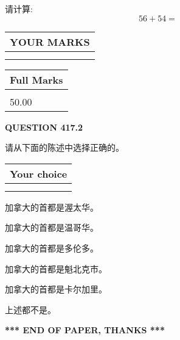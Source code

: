 \documentclass{ctexart}
\begin{document}
  
 
请计算:
\begin{equation}
56 +  %
54 = \nonumber
\end{equation}
 

 

 
  
\vspace{0.2in}
  
\noindent\begin{tabular}{|l|}
\hline
 YOUR MARKS  \\
\hline
 \\ 
 \\ 
\hline
\end{tabular}
\hspace{0.05in} \begin{tabular}{|l|}
\hline
 Full Marks  \\
\hline
 \\ 
50.00 \\
\hline
\end{tabular}
{\textbf{\Large{QUESTION
417.2 
}}}
  
  
请从下面的陈述中选择正确的。
  
  
\noindent\hspace{3.0in} \begin{tabular}{|l|}
\hline
Your choice \\
\hline
 \\ 
 \\ 
\hline
\end{tabular}
  
  
 
 
加拿大的首都是渥太华。
 
 
加拿大的首都是温哥华。
 
 
加拿大的首都是多伦多。
 
 
加拿大的首都是魁北克市。
 
 
加拿大的首都是卡尔加里。
 
 
 上述都不是。
 
 
   
   
 \vspace{0.2in}
 
   
   
   
   
\vspace{1.0in} 
{\textbf{\large{ *** END OF PAPER, THANKS *** }}} 
   
\end{document}
